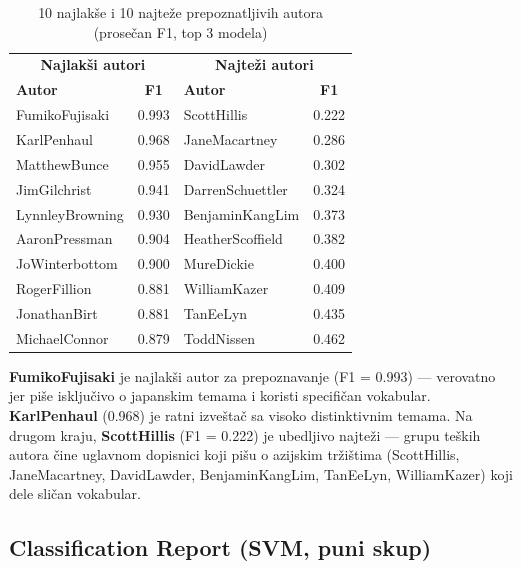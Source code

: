\documentclass[12pt, a4paper]{article}
\begin{document}
\begin{table}[H]
\centering
\caption{10 najlakše i 10 najteže prepoznatljivih autora (prosečan F1, top 3 modela)}
\begin{tabular}{lc|lc}
\toprule
\multicolumn{2}{c|}{\textbf{Najlakši autori}} & \multicolumn{2}{c}{\textbf{Najteži autori}} \\
\textbf{Autor}         & \textbf{F1} & \textbf{Autor}        & \textbf{F1} \\
\midrule
FumikoFujisaki         & 0.993       & ScottHillis           & 0.222 \\
KarlPenhaul            & 0.968       & JaneMacartney         & 0.286 \\
MatthewBunce           & 0.955       & DavidLawder           & 0.302 \\
JimGilchrist           & 0.941       & DarrenSchuettler      & 0.324 \\
LynnleyBrowning        & 0.930       & BenjaminKangLim       & 0.373 \\
AaronPressman          & 0.904       & HeatherScoffield      & 0.382 \\
JoWinterbottom         & 0.900       & MureDickie            & 0.400 \\
RogerFillion           & 0.881       & WilliamKazer          & 0.409 \\
JonathanBirt           & 0.881       & TanEeLyn              & 0.435 \\
MichaelConnor          & 0.879       & ToddNissen            & 0.462 \\
\bottomrule
\end{tabular}
\end{table}

\textbf{FumikoFujisaki} je najlakši autor za prepoznavanje (F1 = 0.993) — verovatno
jer piše isključivo o japanskim temama i koristi specifičan vokabular. \textbf{KarlPenhaul}
(0.968) je ratni izveštač sa visoko distinktivnim temama. Na drugom kraju,
\textbf{ScottHillis} (F1 = 0.222) je ubedljivo najteži — grupu teških autora čine
uglavnom dopisnici koji pišu o azijskim tržištima (ScottHillis, JaneMacartney,
DavidLawder, BenjaminKangLim, TanEeLyn, WilliamKazer) koji dele sličan vokabular.

\subsection{Classification Report (SVM, puni skup)}
\end{document}
